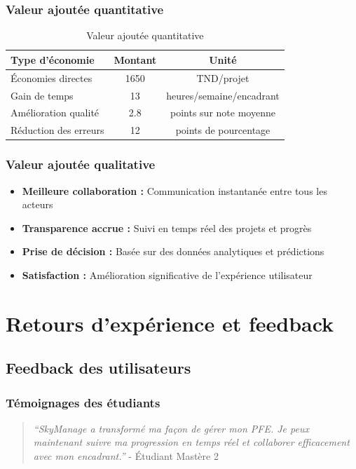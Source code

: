 \subsubsection{Valeur ajoutée quantitative}
\begin{table}[h!]
\centering
\caption{Valeur ajoutée quantitative}
\label{tab:quantitative-value}
\begin{tabular}{|l|c|c|}
\hline
\textbf{Type d'économie} & \textbf{Montant} & \textbf{Unité} \\
\hline
Économies directes & 1650 & TND/projet \\
\hline
Gain de temps & 13 & heures/semaine/encadrant \\
\hline
Amélioration qualité & 2.8 & points sur note moyenne \\
\hline
Réduction des erreurs & 12 & points de pourcentage \\
\hline
\end{tabular}
\end{table}

\subsubsection{Valeur ajoutée qualitative}
\begin{itemize}
    \item \textbf{Meilleure collaboration :} Communication instantanée entre tous les acteurs
    \item \textbf{Transparence accrue :} Suivi en temps réel des projets et progrès
    \item \textbf{Prise de décision :} Basée sur des données analytiques et prédictions
    \item \textbf{Satisfaction :} Amélioration significative de l'expérience utilisateur
\end{itemize}

\section{Retours d'expérience et feedback}

\subsection{Feedback des utilisateurs}

\subsubsection{Témoignages des étudiants}
\begin{quote}
\textit{``SkyManage a transformé ma façon de gérer mon PFE. Je peux maintenant suivre ma progression en temps réel et collaborer efficacement avec mon encadrant.''} - Étudiant Mastère 2
\end{quote}


